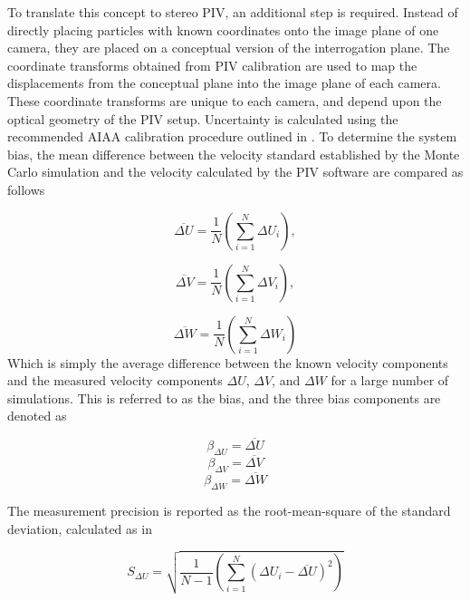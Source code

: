 To translate this concept to stereo PIV, an additional step is required. 
Instead of directly placing particles with known coordinates onto the image 
plane of one camera, they are placed on a conceptual version of the 
interrogation plane. The coordinate transforms obtained from PIV calibration 
are used to map the displacements from the conceptual plane into the image 
plane of each camera. These coordinate transforms are unique to each camera, 
and depend upon the optical geometry of the PIV setup. Uncertainty is 
calculated using the recommended AIAA calibration procedure outlined in 
\cite{PIVuncertAIAA}. To determine the system bias, the mean difference between 
the velocity standard established by the Monte Carlo simulation and the 
velocity calculated by the PIV software are compared as follows

\begin{equation}
\overline{\Delta U} = \frac{1}{N} \left(\sum_{i=1}^N \Delta U_i \right),
\label{eq:Uerror}
\end{equation}

\begin{equation}
\overline{\Delta V} = \frac{1}{N} \left(\sum_{i=1}^N \Delta V_i \right),
\label{eq:Verror}
\end{equation}

\begin{equation}
\overline{\Delta W} = \frac{1}{N} \left(\sum_{i=1}^N \Delta W_i \right)
\label{eq:Werror}
\end{equation}
%
Which is simply the average difference between the known velocity components 
and the measured velocity components $\Delta U$, $\Delta V$, and $\Delta W$ for 
a large number of simulations. This is referred to as the bias, and the three 
bias components are denoted as

\begin{equation}
\beta_{\Delta U} = \overline{\Delta U}
\label{eq:Ubias}
\end{equation}
\begin{equation}
\beta_{\Delta V} = \overline{\Delta V}
\label{eq:Vbias}
\end{equation}
\begin{equation}
\beta_{\Delta W} = \overline{\Delta W}
\label{eq:Wbias}
\end{equation}

The measurement precision is reported as the root-mean-square of the  
standard deviation, calculated as in 
	
\begin{equation}
S_{\Delta U} = \sqrt{\frac{1}{N-1} \left(\sum_{i=1}^N (\Delta U_i - 
\overline{\Delta U})^2 \right)}
\label{eq:Usd}
\end{equation}

